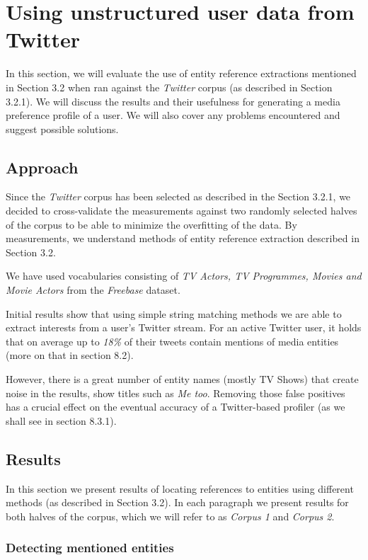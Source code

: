 \section{Using unstructured user data from Twitter}

In this section, we will evaluate the use of entity reference extractions
mentioned in Section 3.2 when ran against the \textit{Twitter} corpus (as described in Section 3.2.1).
We will discuss the results and their usefulness for generating a media preference profile of a user.
We will also cover any problems encountered and suggest possible solutions.

\subsection{Approach}
Since the \textit{Twitter} corpus has been selected as described in the Section 3.2.1,
we decided to cross-validate the measurements against two randomly selected halves of the corpus
to be able to minimize the overfitting of the data. By measurements, we understand methods of
entity reference extraction described in Section 3.2.

We have used vocabularies consisting of \textit{TV Actors, TV Programmes, Movies and Movie Actors} from
the \textit{Freebase} dataset.

Initial results show that using simple string matching methods we are able to extract interests from
a user's Twitter stream. For an active Twitter user, it holds that on average up to \textit{18\%} of their tweets
contain mentions of media entities (more on that in section 8.2).

However, there is a great number of entity names (mostly TV Shows) that create noise in the results, \eg show titles such as \textit{Me too}. Removing those false positives has a crucial effect on the eventual accuracy of a Twitter-based profiler
(as we shall see in section 8.3.1).

\subsection{Results}
In this section we present results of locating references to entities using different methods (as described in Section 3.2).
In each paragraph we present results for both halves of the corpus, which we will refer to as \textit{Corpus 1} and
\textit{Corpus 2}.

\subsubsection{Detecting mentioned entities}
